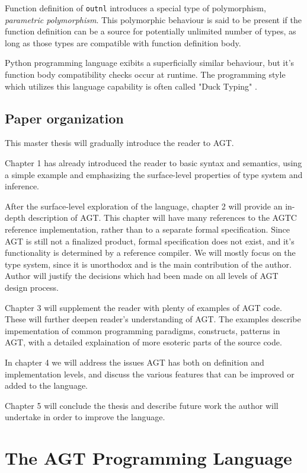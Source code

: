 \documentclass[times, utf8, diplomski]{fer}
\theoremstyle{definition}
\begin{document}
Function definition of \texttt{outnl} introduces a special type of polymorphism, 
\textit{parametric polymorphism}. This polymorphic behaviour is said to be present if the
function definition can be a source for potentially unlimited number of types, 
as long as those types are compatible with function definition body.

Python programming language exibits a superficially similar behaviour, but it's
function body compatibility checks occur at runtime. 
The programming style which utilizes this language capability is often called "Duck Typing" 
\citep{c_py_duck_typing}.


\section{Paper organization}

This master thesis will gradually introduce the reader to AGT. 

Chapter 1 has already introduced the reader to basic syntax and semantics,
using a simple example and emphasizing the surface-level properties of type system and inference. 

After the surface-level exploration of the language, chapter 2 will provide an in-depth description of AGT.
This chapter will have many references to the AGTC reference implementation, 
rather than to a separate formal specification. Since AGT is still not a finalized product,
formal specification does not exist, and it's functionality is determined by a reference compiler.
We will mostly focus on the type system, since it is unorthodox and is the main contribution of the author.
Author will justify the decisions which had been made on all levels of AGT design process.

Chapter 3 will supplement the reader with plenty of examples of AGT code. These will
further deepen reader's understanding of AGT. The examples describe impementation
of common programming paradigms, constructs, patterns in AGT, with a detailed explaination
of more esoteric parts of the source code.

In chapter 4 we will address the issues AGT has both on definition and implementation levels,
and discuss the various features that can be improved or added to the language.

Chapter 5 will conclude the thesis and describe future work the author will undertake in order to
improve the language.

\chapter{The AGT Programming Language}\label{chap:main}
\end{document}
